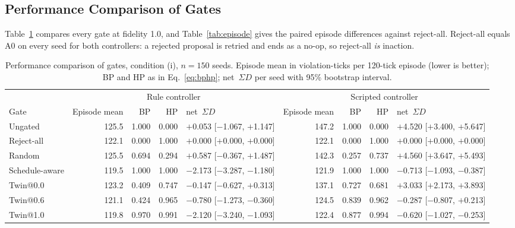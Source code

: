 \documentclass[conference]{IEEEtran}
\newcommand{\netSD}{net~$\Sigma D$}
\begin{document}
\subsection{Performance Comparison of Gates}

Table~\ref{tab:gates} compares every gate at fidelity 1.0, and Table~\ref{tab:episode} gives the paired episode differences against reject-all. Reject-all equals A0 on every seed for both controllers: a rejected proposal is retried and ends as a no-op, so reject-all \emph{is} inaction.

\begin{table}[t]
\centering
\caption{Performance comparison of gates, condition (i), $n=150$ seeds. Episode mean in violation-ticks per 120-tick episode (lower is better); BP and HP as in Eq.~\eqref{eq:bphp}; \netSD{} per seed with 95\% bootstrap interval.}
\label{tab:gates}
\footnotesize
\setlength{\tabcolsep}{4pt}
\begin{tabular}{@{}lrrrlrrrl@{}}
\toprule
& \multicolumn{4}{c}{Rule controller} & \multicolumn{4}{c}{Scripted controller} \\
\cmidrule(lr){2-5}\cmidrule(lr){6-9}
Gate & Episode mean & BP & HP & \netSD{} & Episode mean & BP & HP & \netSD{} \\
\midrule
Ungated & 125.5 & 1.000 & 0.000 & \ensuremath{+}0.053 [\ensuremath{-}1.067, \ensuremath{+}1.147] & 147.2 & 1.000 & 0.000 & \ensuremath{+}4.520 [\ensuremath{+}3.400, \ensuremath{+}5.647] \\
Reject-all & 122.1 & 0.000 & 1.000 & \ensuremath{+}0.000 [\ensuremath{+}0.000, \ensuremath{+}0.000] & 122.1 & 0.000 & 1.000 & \ensuremath{+}0.000 [\ensuremath{+}0.000, \ensuremath{+}0.000] \\
Random & 125.5 & 0.694 & 0.294 & \ensuremath{+}0.587 [\ensuremath{-}0.367, \ensuremath{+}1.487] & 142.3 & 0.257 & 0.737 & \ensuremath{+}4.560 [\ensuremath{+}3.647, \ensuremath{+}5.493] \\
Schedule-aware & 119.5 & 1.000 & 1.000 & \ensuremath{-}2.173 [\ensuremath{-}3.287, \ensuremath{-}1.180] & 121.9 & 1.000 & 1.000 & \ensuremath{-}0.713 [\ensuremath{-}1.093, \ensuremath{-}0.387] \\
Twin@0.0 & 123.2 & 0.409 & 0.747 & \ensuremath{-}0.147 [\ensuremath{-}0.627, \ensuremath{+}0.313] & 137.1 & 0.727 & 0.681 & \ensuremath{+}3.033 [\ensuremath{+}2.173, \ensuremath{+}3.893] \\
Twin@0.6 & 121.1 & 0.424 & 0.965 & \ensuremath{-}0.780 [\ensuremath{-}1.273, \ensuremath{-}0.360] & 124.5 & 0.839 & 0.962 & \ensuremath{-}0.287 [\ensuremath{-}0.807, \ensuremath{+}0.213] \\
Twin@1.0 & 119.8 & 0.970 & 0.991 & \ensuremath{-}2.120 [\ensuremath{-}3.240, \ensuremath{-}1.093] & 122.4 & 0.877 & 0.994 & \ensuremath{-}0.620 [\ensuremath{-}1.027, \ensuremath{-}0.253] \\
\bottomrule
\end{tabular}
\end{table}
\end{document}
